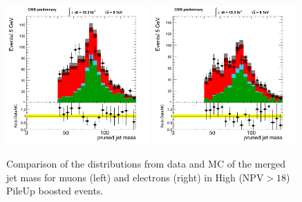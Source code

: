 \begin{figure}[h!t]
  {\centering
    \includegraphics[width=0.49\textwidth]{figs/puchecks/mu_HighNPV_GroomedJet_mass.png}
    \includegraphics[width=0.49\textwidth]{figs/puchecks/el_HighNPV_GroomedJet_mass.png}
    \caption{Comparison of the distributions from data and MC of the
    merged jet mass for muons (left) and electrons (right)
    in High (NPV$>18$) PileUp boosted events.}
\label{fig:pu_GroomedJet_massHigh}}
\end{figure}
